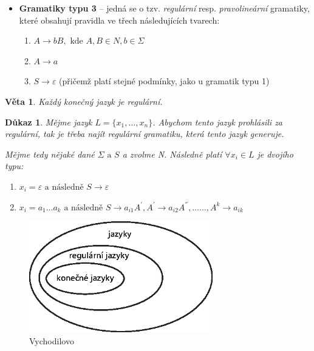 \documentclass[10pt, a4paper, titlepage]{article}
\theoremstyle{note}
\newtheorem{dukaz}{Důkaz}
\newtheorem{veta}{Věta}
\begin{document}
\begin{itemize}
\item
\textbf{Gramatiky typu 3\label{gram-3}} -- jedná se o tzv. \emph{regulární} resp. \emph{pravolineární} gramatiky, které obsahují pravidla ve třech následujících tvarech:

\begin{enumerate}
\item
$A \rightarrow bB, \text{ kde } A,B \in N, b \in \Sigma$

\item
$A \rightarrow a$

\item
$S \rightarrow \varepsilon$ (přičemž platí stejné podmínky, jako u gramatik typu 1)
\end{enumerate}

\end{itemize}

\begin{veta}
Každý konečný jazyk je regulární.
\end{veta}

\begin{dukaz}
Mějme jazyk $L = \lbrace x_{1},\ldots, x_{n} \rbrace$. Abychom tento jazyk prohlásili za regulární, tak je třeba najít regulární gramatiku,
která tento jazyk generuje.

Mějme tedy nějaké dané $\Sigma \text{ a } S$ a zvolme \emph{N}. Následně platí $\forall x_{i} \in L$ je dvojího typu:

\begin{enumerate}
\item
$x_{i} = \varepsilon \text{ a následně } S \rightarrow \varepsilon$

\item
$x_{i} = a_{1}\ldots a_{k} \text{ a následně } S \rightarrow a_{i1}A^{'}, A^{'} \rightarrow a_{i2}A^{''},\ldots\ldots, A^{k} \rightarrow a_{ik}$
\end{enumerate}
\end{dukaz}

\begin{figure}[ht]
\centering\includegraphics[width=8cm]{vajicko-1.eps}
\caption{Vychodilovo }\label{obr-2}
\end{figure}
\end{document}
